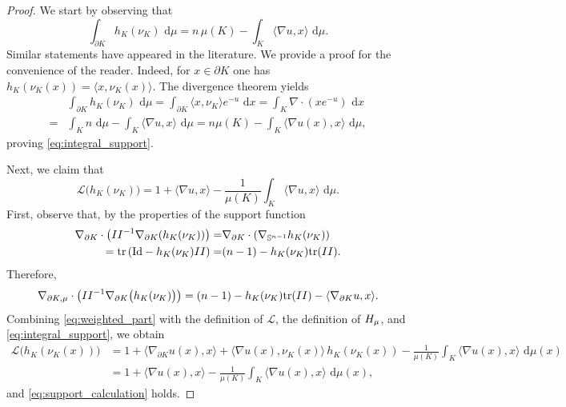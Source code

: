 \documentclass[10pt,a4paper]{amsart}
\newcommand{\Id}{\mathrm{Id}}
\newcommand{\di}{\, \mathrm{d}}
\newcommand{\sph}{\mathbb{S}}
\newcommand{\tra}{\mathrm{tr}}
\begin{document}
\begin{proof}
We start by observing that 
\begin{equation}\label{eq:integral_support}
    \int_{\partial K} h_{K}(\nu_{K})\,\di \mu
= n\,\mu(K) -\int_{K}\langle \nabla u,x\rangle \,\di \mu.
\end{equation}
Similar statements have appeared in the literature. We provide a proof for the convenience of the reader. Indeed, for $x\in \partial K$ one has $h_{K}(\nu_{K}(x))=\langle x,\nu_{K}(x)\rangle$. The divergence theorem yields
\begin{align*}
&\int_{\partial K}h_{K}(\nu_{K})\,\di\mu
=\int_{\partial K} \langle x, \nu_{K}\rangle e^{-u}\,\di x=
\int_{K} \nabla \cdot \left(x e^{-u}\right)\,\di x \\
=&\int_{K} n\,\di\mu -\int_{K}\langle \nabla u,x\rangle\,\di \mu 
=n\mu(K)-\int_{K}\langle \nabla u(x),x\rangle\,\di \mu,
\end{align*}
proving \eqref{eq:integral_support}.

Next, we claim that
\begin{equation}\label{eq:support_calculation}
\mathcal{L}\big(h_{K}(\nu_{K})\big) = 1+\langle \nabla u,x\rangle -\frac{1}{\mu(K)}\int_{K} \langle \nabla u, x\rangle \,\di \mu.
\end{equation}
First, observe that, by the properties of the support function
\begin{align*}
    \nabla_{\partial K} \cdot \left( {\rm II}^{-1} \nabla_{\partial K}(h_K(\nu_K))\right)= & \nabla_{\partial K}\cdot \left( \nabla_{\sph^{n-1}}h_K(\nu_K)\right)\\
    = \tra\left( \Id -h_K(\nu_K){\rm II}\right)= &(n-1)-h_K(\nu_K)\tra({\rm II}).
\end{align*}
Therefore,
\begin{equation}\label{eq:weighted_part}
\nabla_{\partial K, \mu} \cdot \left({\rm II}^{-1}\nabla_{\partial K}\big(h_{K}(\nu_{K})\big)\right) =(n-1)-h_K(\nu_K)\tra({\rm II})
-\langle \nabla_{\partial K}u, x\rangle .
\end{equation}
Combining \eqref{eq:weighted_part} with the definition of $\mathcal{L}$, the definition of ${\rm H}_\mu$, and \eqref{eq:integral_support}, we obtain
\begin{align*}
\mathcal{L}\big(h_{K}(\nu_{K}(x))\big)
&=
1+\langle \nabla_{\partial K}u(x), x\rangle
+\langle \nabla u(x), \nu_{K}(x)\rangle\,h_{K}(\nu_{K}(x))
-\frac{1}{\mu(K)} \int_{K} \langle \nabla u(x), x\rangle \,\di \mu(x) \\
&=
1+\langle \nabla u(x), x\rangle
-\frac{1}{\mu(K)}\int_{K} \langle \nabla u(x), x\rangle \,\di \mu(x),
\end{align*}
and \eqref{eq:support_calculation} holds. 


\end{proof}
\end{document}
